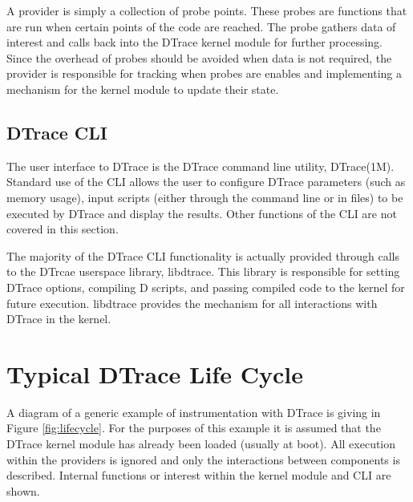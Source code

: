 A provider is simply a collection of probe points. These probes are functions that are run when certain points of the code are reached. The probe gathers data of interest and calls back into the DTrace kernel module for further processing. Since the overhead of probes should be avoided when data is not required, the provider is responsible for tracking when probes are enables and implementing a mechanism for the kernel module to update their state.

\subsection{DTrace CLI}

The user interface to DTrace is the DTrace command line utility, DTrace(1M). Standard use of the CLI allows the user to configure DTrace parameters (such as memory usage), input scripts (either through the command line or in files) to be executed by DTrace and display the results. Other functions of the CLI are not covered in this section.

The majority of the DTrace CLI functionality is actually provided through calls to the DTrcae userspace library, libdtrace. This library is responsible for setting DTrace options, compiling D scripts, and passing compiled code to the kernel for future execution. libdtrace provides the mechanism for all interactions with DTrace in the kernel.

\section{Typical DTrace Life Cycle}

A diagram of a generic example of instrumentation with DTrace is giving in Figure \ref{fig:lifecycle}. For the purposes of this example it is assumed that the DTrace kernel module has already been loaded (usually at boot). All execution within the providers is ignored and only the interactions between components is described. Internal functions or interest within the kernel module and CLI are shown.

